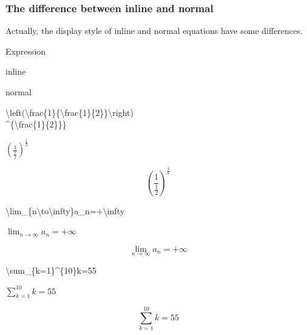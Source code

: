 \documentclass{beamer}
\newcommand{\samplecommand}[1]{\alert{\textbackslash #1}}
\begin{document}
\begin{frame}
	\frametitle{The difference between inline and normal}
	Actually, the display style of inline and normal equations have some differences.
	\begin{example}
		\begin{minipage}{0.48\linewidth}
			\centering Expression
		\end{minipage}
		\begin{minipage}{0.24\linewidth}
			\centering inline
		\end{minipage}
		\begin{minipage}{0.24\linewidth}
			\centering normal
		\end{minipage}
		\vfill
		\begin{minipage}{0.48\linewidth}
			\samplecommand{left(}\samplecommand{frac}\{1\}\{\samplecommand{frac}\{1\}\{2\}\}\samplecommand{right)}\\
			\^{}\{\samplecommand{frac}\{1\}\{2\}\}\}
		\end{minipage}
		\begin{minipage}{0.24\linewidth}
			\centering $\left(\frac{1}{\frac{1}{2}}\right)^{\frac{1}{2}}$
		\end{minipage}
		\begin{minipage}{0.24\linewidth}
			$$\left(\frac{1}{\frac{1}{2}}\right)^{\frac{1}{2}}$$
		\end{minipage}
		\vfill
		\begin{minipage}{0.48\linewidth}
			\samplecommand{lim}\_\{n\samplecommand{to}\samplecommand{infty}\}a\_n=+\samplecommand{infty}
		\end{minipage}
		\begin{minipage}{0.24\linewidth}
			\centering $\lim_{n\to\infty}a_n=+\infty$
		\end{minipage}
		\begin{minipage}{0.24\linewidth}
			$$\lim_{n\to\infty}a_n=+\infty$$
		\end{minipage}
		\vfill
		\begin{minipage}{0.48\linewidth}
			\samplecommand{sum}\_\{k=1\}\^{}\{10\}k=55
		\end{minipage}
		\begin{minipage}{0.24\linewidth}
			\centering $\sum_{k=1}^{10}k=55$
		\end{minipage}
		\begin{minipage}{0.24\linewidth}
			$$\sum_{k=1}^{10}k=55$$
		\end{minipage}
	\end{example}
\end{frame} 
\end{document}
